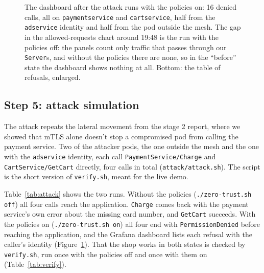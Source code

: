 \documentclass[12pt,a4paper]{article}
\begin{document}
\begin{figure}[H]
  \centering

  \vspace{0.5em}
  \caption{The dashboard after the attack runs with the policies on: 16
    denied calls, all on \texttt{paymentservice} and
    \texttt{cartservice}, half from the \texttt{adservice} identity and half
    from the pod outside the mesh. The gap in the allowed-requests chart
    around 19:48 is the run with the policies off: the panels count only
    traffic that passes through our \texttt{Server}s, and without the
    policies there are none, so in the ``before'' state the dashboard shows
    nothing at all. Bottom: the table of refusals, enlarged.}
  \label{fig:grafana}
\end{figure}

\subsection*{Step 5: attack simulation}

The attack repeats the lateral movement from the stage 2 report, where we
showed that mTLS alone doesn't stop a compromised pod from calling the
payment service. Two of the attacker pods, the one outside the mesh and the
one with the \texttt{adservice} identity, each call
\texttt{PaymentService/Charge} and \texttt{CartService/GetCart} directly,
four calls in total (\texttt{attack/attack.sh}). The script is the short
version of \texttt{verify.sh}, meant for the live demo.

Table~\ref{tab:attack} shows the two runs. Without the policies
(\texttt{./zero-trust.sh off}) all four calls reach the application.
\texttt{Charge} comes back with the payment service's own error about the
missing card number, and \texttt{GetCart} succeeds. With the policies on
(\texttt{./zero-trust.sh on}) all four end with \texttt{PermissionDenied}
before reaching the application, and the Grafana dashboard lists each refusal
with the caller's identity (Figure~\ref{fig:grafana}). That the shop works
in both states is checked by \texttt{verify.sh}, run once with the policies
off and once with them on (Table~\ref{tab:verify}).
\end{document}
